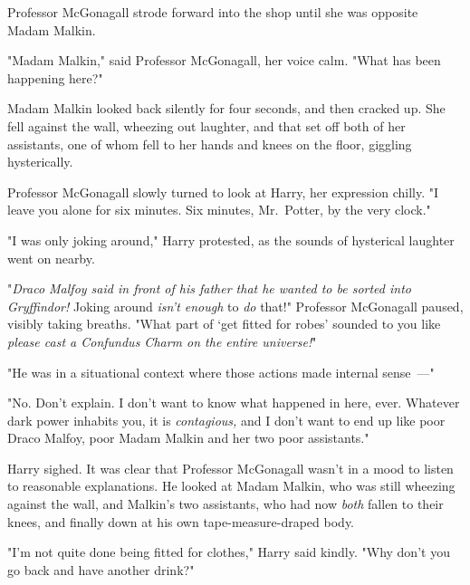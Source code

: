 Professor McGonagall strode forward into the shop until she was opposite Madam
Malkin.

"Madam Malkin," said Professor McGonagall, her voice calm. "What has been
happening here?"

Madam Malkin looked back silently for four seconds, and then cracked up. She
fell against the wall, wheezing out laughter, and that set off both of her
assistants, one of whom fell to her hands and knees on the floor, giggling
hysterically.

Professor McGonagall slowly turned to look at Harry, her expression chilly. "I
leave you alone for six minutes. Six minutes, Mr.~Potter, by the very clock."

"I was only joking around," Harry protested, as the sounds of hysterical
laughter went on nearby.

"\emph{Draco Malfoy said in front of his father that he wanted to be sorted
into Gryffindor!} Joking around \emph{isn't enough} to \emph{do} that!"
Professor McGonagall paused, visibly taking breaths. "What part of `get fitted
for robes' sounded to you like \emph{please cast a Confundus Charm on the
entire universe!}"

"He was in a situational context where those actions made internal sense~---"

"No. Don't explain. I don't want to know what happened in here, ever. Whatever
dark power inhabits you, it is \emph{contagious,} and I don't want to end up
like poor Draco Malfoy, poor Madam Malkin and her two poor assistants."

Harry sighed. It was clear that Professor McGonagall wasn't in a mood to listen
to reasonable explanations. He looked at Madam Malkin, who was still wheezing
against the wall, and Malkin's two assistants, who had now \emph{both} fallen
to their knees, and finally down at his own tape-measure-draped body.

"I'm not quite done being fitted for clothes," Harry said kindly. "Why don't
you go back and have another drink?"
